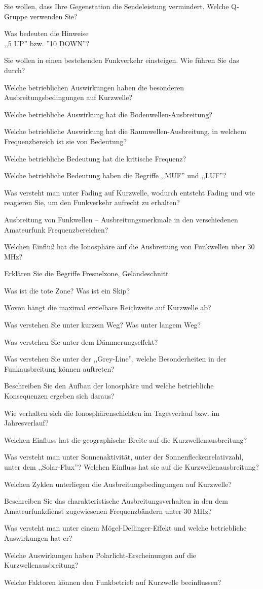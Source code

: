 \documentclass[avery5371,grid,frame,a4paper]{flashcards}
\newcommand\question[2]{
  \begin{flashcard}[{\chap} -- #1]{#2}\end{flashcard}
}
\begin{document}
\question{04}{Sie wollen, dass Ihre Gegenstation die Sendeleistung vermindert. Welche Q-Gruppe verwenden Sie?}{}
\question{05}{Was bedeuten die Hinweise \\ ,,5 UP'' bzw. ''10 DOWN''?}{}
\question{06}{Sie wollen in einen bestehenden Funkverkehr einsteigen. Wie führen Sie das durch?}{}
\question{07}{Welche betrieblichen Auswirkungen haben die besonderen Ausbreitungsbedingungen auf Kurzwelle?}{}
\question{08}{Welche betriebliche Auswirkung hat die Bodenwellen-Ausbreitung?}{}
\question{09}{Welche betriebliche Auswirkung hat die Raumwellen-Ausbreitung, in welchem Frequenzbereich ist sie von Bedeutung?}{}
\question{10}{Welche betriebliche Bedeutung hat die kritische Frequenz?}{}
\question{11}{Welche betriebliche Bedeutung haben die Begriffe ,,MUF'' und ,,LUF''?}{}
\question{12}{Was versteht man unter Fading auf Kurzwelle, wodurch entsteht Fading und wie reagieren Sie, um den Funkverkehr aufrecht zu erhalten?}{}
\question{13}{Ausbreitung von Funkwellen -- Ausbreitungsmerkmale in den verschiedenen Amateurfunk Frequenzbereichen?}{}
\question{14}{Welchen Einfluß hat die Ionosphäre auf die Ausbreitung von Funkwellen über 30 MHz?}{}
\question{15}{Erklären Sie die Begriffe Fresnelzone, Geländeschnitt}{}
\question{16}{Was ist die tote Zone? Was ist ein Skip?}{}
\question{17}{Wovon hängt die maximal erzielbare Reichweite auf Kurzwelle ab?}
\question{18}{Was verstehen Sie unter kurzem Weg? Was unter langem Weg?}
\question{19}{Was verstehen Sie unter dem Dämmerungseffekt?}
\question{20}{Was verstehen Sie unter der ,,Grey-Line'', welche Besonderheiten in der Funkausbreitung können auftreten?}
\question{21}{Beschreiben Sie den Aufbau der lonosphäre und welche betriebliche Konsequenzen ergeben sich daraus?}
\question{22}{Wie verhalten sich die Ionosphärenschichten im Tagesverlauf bzw. im Jahresverlauf?}
\question{23}{Welchen Einfluss hat die geographische Breite auf die Kurzwellenausbreitung?}
\question{24}{Was versteht man unter Sonnenaktivität, unter der Sonnenfleckenrelativzahl, unter dem ,,Solar-Flux''? Welchen Einfluss hat sie auf die Kurzwellenausbreitung?}
\question{25}{Welchen Zyklen unterliegen die Ausbreitungsbedingungen auf Kurzwelle?}
\question{26}{Beschreiben Sie das charakteristische Ausbreitungsverhalten in den dem Amateurfunkdienst zugewiesenen Frequenzbändern unter 30 MHz?}
\question{27}{Was versteht man unter einem Mögel-Dellinger-Effekt und welche betriebliche Auswirkungen hat er?}
\question{28}{Welche Auswirkungen haben Polarlicht-Erscheinungen auf die Kurzwellenausbreitung?}
\question{29}{Welche Faktoren können den Funkbetrieb auf Kurzwelle beeinflussen?}
\end{document}
